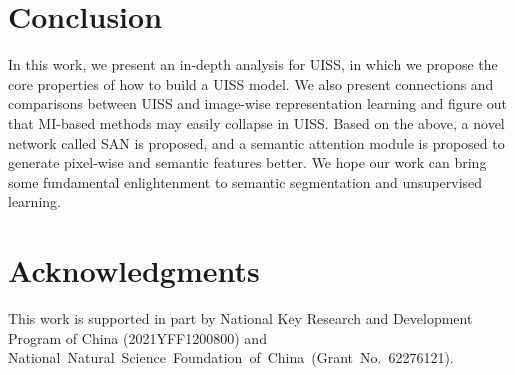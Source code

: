 \documentclass[letterpaper]{article} \usepackage{aaai23}  \usepackage{times}  \usepackage{helvet}  \usepackage{courier}  \usepackage[hyphens]{url}  \usepackage{graphicx} \urlstyle{rm} \def\UrlFont{\rm}  \usepackage{natbib}  \usepackage{caption} \frenchspacing  \setlength{\pdfpagewidth}{8.5in}  \setlength{\pdfpageheight}{11in}  \usepackage{algorithm}
\begin{document}
\section{Conclusion}
In this work, we present an in-depth analysis for UISS, in which we propose the core properties of how to build a UISS model. We also present connections and comparisons between UISS and image-wise representation learning and figure out that MI-based methods may easily collapse in UISS. Based on the above, a novel network called SAN is proposed, and a semantic attention module is proposed to generate pixel-wise and semantic features better. We hope our work can bring some fundamental enlightenment to semantic segmentation and unsupervised learning.

\section{Acknowledgments}
This work is supported in part by National Key Research and Development Program of China (2021YFF1200800) and National Natural Science Foundation of China (Grant No. 62276121).


\end{document}
